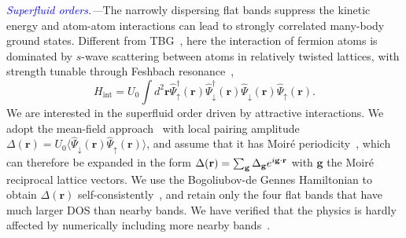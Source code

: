 \documentclass[twocolumn,english,prl,floatfix,citeautoscript,nofootinbib]{revtex4}
\begin{document}
\emph{\textcolor{blue}{Superfluid orders}.---}The narrowly dispersing flat
bands suppress the kinetic energy and atom-atom interactions can lead to
strongly correlated many-body ground states. Different from TBG~\cite%
{PhysRevB.98.220504,PhysRevLett.122.257002,PhysRevLett.121.257001,
PhysRevX.8.041041,PhysRevLett.121.217001,PhysRevLett.122.026801}, here the
interaction of fermion atoms is dominated by $s$-wave scattering between atoms in relatively
twisted lattices, with strength tunable through Feshbach resonance~\cite%
{RevModPhys.82.1225,alkaline.earth.feshbach},
\begin{equation}
H_{\text{int}}=U_{0}\int d^{2}\mathbf{r}\hat{\Psi}_{\uparrow }^{\dag }(%
\mathbf{r})\hat{\Psi}_{\downarrow }^{\dag }(\mathbf{r})\hat{\Psi}%
_{\downarrow }(\mathbf{r})\hat{\Psi}_{\uparrow }(\mathbf{r}).
\end{equation}%
We are interested in the superfluid order driven by attractive interactions.
We adopt the mean-field approach~\cite%
{PhysRevB.98.220504,PhysRevLett.122.257002,PhysRevLett.121.257001} with
local pairing amplitude $\Delta (\mathbf{r})=U_{0}\langle \hat{\Psi}%
_{\downarrow }(\mathbf{r})\hat{\Psi}_{\uparrow }(\mathbf{r})\rangle $, and
assume that it has Moir\'{e} periodicity~\cite{PhysRevLett.121.257001},
which can therefore be expanded in the form $\Delta (\mathbf{r})=\sum_{%
\mathbf{g}}\Delta _{\mathbf{g}}e^{i\mathbf{g}\cdot \mathbf{r}}$ with $%
\mathbf{g}$ the Moir\'{e} reciprocal lattice vectors.
We use the Bogoliubov-de Gennes Hamiltonian to obtain $\Delta (\mathbf{r})$
self-consistently~\cite{SM}, and retain only the four flat bands that have
much larger DOS than nearby bands. We have verified that the physics is
hardly affected by numerically including more nearby bands~\cite{SM}.
\end{document}
